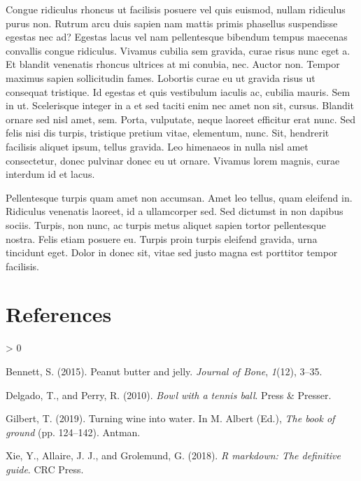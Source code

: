 \documentclass[
]{article}
\newlength{\cslhangindent}
\newenvironment{CSLReferences}[2] %
 {%
  \setlength{\parindent}{0pt}
  \ifodd #1 \everypar{\setlength{\hangindent}{\cslhangindent}}\ignorespaces\fi
  \ifnum #2 > 0
  \setlength{\parskip}{#2\baselineskip}
  \fi
 }%
 {}
\begin{document}
Congue ridiculus rhoncus ut facilisis posuere vel quis euismod, nullam
ridiculus purus non. Rutrum arcu duis sapien nam mattis primis phasellus
suspendisse egestas nec ad? Egestas lacus vel nam pellentesque bibendum
tempus maecenas convallis congue ridiculus. Vivamus cubilia sem gravida,
curae risus nunc eget a. Et blandit venenatis rhoncus ultrices at mi
conubia, nec. Auctor non. Tempor maximus sapien sollicitudin fames.
Lobortis curae eu ut gravida risus ut consequat tristique. Id egestas et
quis vestibulum iaculis ac, cubilia mauris. Sem in ut. Scelerisque
integer in a et sed taciti enim nec amet non sit, cursus. Blandit ornare
sed nisl amet, sem. Porta, vulputate, neque laoreet efficitur erat nunc.
Sed felis nisi dis turpis, tristique pretium vitae, elementum, nunc.
Sit, hendrerit facilisis aliquet ipsum, tellus gravida. Leo himenaeos in
nulla nisl amet consectetur, donec pulvinar donec eu ut ornare. Vivamus
lorem magnis, curae interdum id et lacus.

Pellentesque turpis quam amet non accumsan. Amet leo tellus, quam
eleifend in. Ridiculus venenatis laoreet, id a ullamcorper sed. Sed
dictumst in non dapibus sociis. Turpis, non nunc, ac turpis metus
aliquet sapien tortor pellentesque nostra. Felis etiam posuere eu.
Turpis proin turpis eleifend gravida, urna tincidunt eget. Dolor in
donec sit, vitae sed justo magna est porttitor tempor facilisis.

\hypertarget{references}{%
\section*{References}\label{references}}

\hypertarget{refs}{}
\begin{CSLReferences}{1}{0}
\leavevmode\hypertarget{ref-bennett2015}{}%
Bennett, S. (2015). Peanut butter and jelly. \emph{Journal of Bone},
\emph{1}(12), 3--35.

\leavevmode\hypertarget{ref-delgado2010}{}%
Delgado, T., and Perry, R. (2010). \emph{Bowl with a tennis ball}. Press
\& Presser.

\leavevmode\hypertarget{ref-gilbert2019}{}%
Gilbert, T. (2019). Turning wine into water. In M. Albert (Ed.),
\emph{The book of ground} (pp. 124--142). Antman.

\leavevmode\hypertarget{ref-xie2018r}{}%
Xie, Y., Allaire, J. J., and Grolemund, G. (2018). \emph{R markdown: The
definitive guide}. CRC Press.

\end{CSLReferences}
\end{document}
